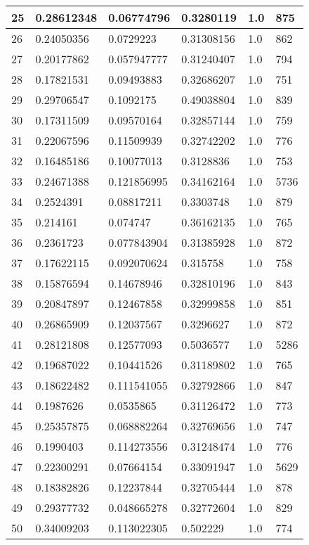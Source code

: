 \begin{longtable}{|l|l|l|l|l|l|}
25 & 0.28612348 & 0.06774796 & 0.3280119 & 1.0 & 875 \\ \hline 
26 & 0.24050356 & 0.0729223 & 0.31308156 & 1.0 & 862 \\ \hline 
27 & 0.20177862 & 0.057947777 & 0.31240407 & 1.0 & 794 \\ \hline 
28 & 0.17821531 & 0.09493883 & 0.32686207 & 1.0 & 751 \\ \hline 
29 & 0.29706547 & 0.1092175 & 0.49038804 & 1.0 & 839 \\ \hline 
30 & 0.17311509 & 0.09570164 & 0.32857144 & 1.0 & 759 \\ \hline 
31 & 0.22067596 & 0.11509939 & 0.32742202 & 1.0 & 776 \\ \hline 
32 & 0.16485186 & 0.10077013 & 0.3128836 & 1.0 & 753 \\ \hline 
33 & 0.24671388 & 0.121856995 & 0.34162164 & 1.0 & 5736 \\ \hline 
34 & 0.2524391 & 0.08817211 & 0.3303748 & 1.0 & 879 \\ \hline 
35 & 0.214161 & 0.074747 & 0.36162135 & 1.0 & 765 \\ \hline 
36 & 0.2361723 & 0.077843904 & 0.31385928 & 1.0 & 872 \\ \hline 
37 & 0.17622115 & 0.092070624 & 0.315758 & 1.0 & 758 \\ \hline 
38 & 0.15876594 & 0.14678946 & 0.32810196 & 1.0 & 843 \\ \hline 
39 & 0.20847897 & 0.12467858 & 0.32999858 & 1.0 & 851 \\ \hline 
40 & 0.26865909 & 0.12037567 & 0.3296627 & 1.0 & 872 \\ \hline 
41 & 0.28121808 & 0.12577093 & 0.5036577 & 1.0 & 5286 \\ \hline 
42 & 0.19687022 & 0.10441526 & 0.31189802 & 1.0 & 765 \\ \hline 
43 & 0.18622482 & 0.111541055 & 0.32792866 & 1.0 & 847 \\ \hline 
44 & 0.1987626 & 0.0535865 & 0.31126472 & 1.0 & 773 \\ \hline 
45 & 0.25357875 & 0.068882264 & 0.32769656 & 1.0 & 747 \\ \hline 
46 & 0.1990403 & 0.114273556 & 0.31248474 & 1.0 & 776 \\ \hline 
47 & 0.22300291 & 0.07664154 & 0.33091947 & 1.0 & 5629 \\ \hline 
48 & 0.18382826 & 0.12237844 & 0.32705444 & 1.0 & 878 \\ \hline 
49 & 0.29377732 & 0.048665278 & 0.32772604 & 1.0 & 829 \\ \hline 
50 & 0.34009203 & 0.113022305 & 0.502229 & 1.0 & 774 \\ \hline 
\end{longtable}